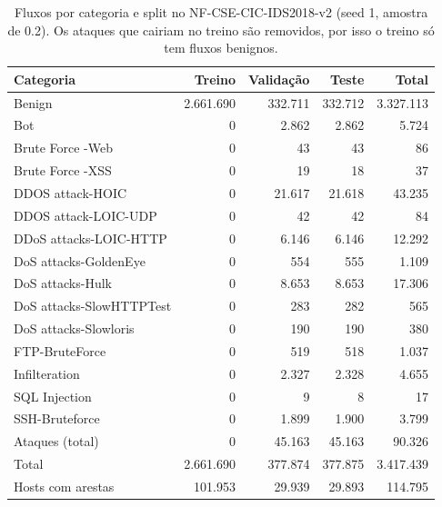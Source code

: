\begin{table}[ht]
\centering
\caption{Fluxos por categoria e split no NF-CSE-CIC-IDS2018-v2 (seed 1, amostra de 0.2). Os ataques que cairiam no treino são removidos, por isso o treino só tem fluxos benignos.}
\label{tab:split-nf-cse-cic-ids2018-v2}
\begin{tabular}{lrrrr}
\toprule
Categoria & Treino & Validação & Teste & Total \\
\midrule
Benign & 2.661.690 & 332.711 & 332.712 & 3.327.113 \\
Bot & 0 & 2.862 & 2.862 & 5.724 \\
Brute Force -Web & 0 & 43 & 43 & 86 \\
Brute Force -XSS & 0 & 19 & 18 & 37 \\
DDOS attack-HOIC & 0 & 21.617 & 21.618 & 43.235 \\
DDOS attack-LOIC-UDP & 0 & 42 & 42 & 84 \\
DDoS attacks-LOIC-HTTP & 0 & 6.146 & 6.146 & 12.292 \\
DoS attacks-GoldenEye & 0 & 554 & 555 & 1.109 \\
DoS attacks-Hulk & 0 & 8.653 & 8.653 & 17.306 \\
DoS attacks-SlowHTTPTest & 0 & 283 & 282 & 565 \\
DoS attacks-Slowloris & 0 & 190 & 190 & 380 \\
FTP-BruteForce & 0 & 519 & 518 & 1.037 \\
Infilteration & 0 & 2.327 & 2.328 & 4.655 \\
SQL Injection & 0 & 9 & 8 & 17 \\
SSH-Bruteforce & 0 & 1.899 & 1.900 & 3.799 \\
Ataques (total) & 0 & 45.163 & 45.163 & 90.326 \\
Total & 2.661.690 & 377.874 & 377.875 & 3.417.439 \\
Hosts com arestas & 101.953 & 29.939 & 29.893 & 114.795 \\
\bottomrule
\end{tabular}
\end{table}

